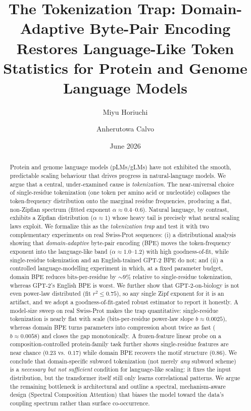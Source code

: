\documentclass[11pt]{article}
\title{\bfseries The Tokenization Trap: Domain-Adaptive Byte-Pair Encoding Restores
Language-Like Token Statistics for Protein and Genome Language Models}
\author[1]{Miyu Horiuchi}
\author[2]{Anherutowa Calvo}
\affil[1]{\texttt{m@replicater.xyz}}
\affil[2]{\texttt{a@9dlabs.xyz}}
\date{June 2026}
\begin{document}
\maketitle

\begin{abstract}
\noindent
Protein and genome language models (pLMs/gLMs) have not exhibited the smooth,
predictable scaling behaviour that drives progress in natural-language models.
We argue that a central, under-examined cause is \emph{tokenization}. The
near-universal choice of single-residue tokenization (one token per amino acid
or nucleotide) collapses the token-frequency distribution onto the marginal
residue frequencies, producing a flat, non-Zipfian spectrum (fitted exponent
$\alpha\!\approx\!0.4$--$0.6$). Natural language, by contrast, exhibits a
Zipfian distribution ($\alpha\!\approx\!1$) whose heavy tail is precisely what
neural scaling laws exploit. We formalize this as the \emph{tokenization trap}
and test it with two complementary experiments on real Swiss-Prot sequences:
(i) a distributional analysis showing that \emph{domain-adaptive} byte-pair
encoding (BPE) moves the token-frequency exponent into the language-like band
($\alpha\!\approx\!1.0$--$1.2$) with high goodness-of-fit, while single-residue
tokenization and an English-trained GPT-2 BPE do not; and (ii) a controlled
language-modelling experiment in which, at a fixed parameter budget, domain BPE
reduces bits-per-residue by $\sim\!9\%$ relative to single-residue tokenization,
whereas GPT-2's English BPE is worst. We further show that GPT-2-on-biology is
not even power-law distributed (fit $r^2\!\le\!0.75$), so any single Zipf
exponent for it is an artifact, and we adopt a goodness-of-fit-gated robust
estimator to report it honestly. A model-size sweep on real Swiss-Prot makes the
trap quantitative: single-residue tokenization is nearly flat with scale
(bits-per-residue power-law slope $b\!\approx\!0.0025$), whereas domain BPE turns
parameters into compression about twice as fast ($b\!\approx\!0.0058$) and closes
the gap monotonically. A frozen-feature linear probe on a composition-controlled
protein-family task further shows single-residue features are near chance ($0.23$
vs.\ $0.17$) while domain BPE recovers the motif structure ($0.86$). We conclude
that domain-specific subword tokenization (not merely \emph{any} subword scheme)
is a \emph{necessary but not sufficient} condition for language-like scaling: it
fixes the input distribution, but the transformer itself still only learns
correlational patterns. We argue the remaining bottleneck is architectural and
outline a spectral, mechanism-aware design (Spectral Composition Attention) that
biases the model toward the data's coupling spectrum rather than surface
co-occurrence.
\end{abstract}
\end{document}
